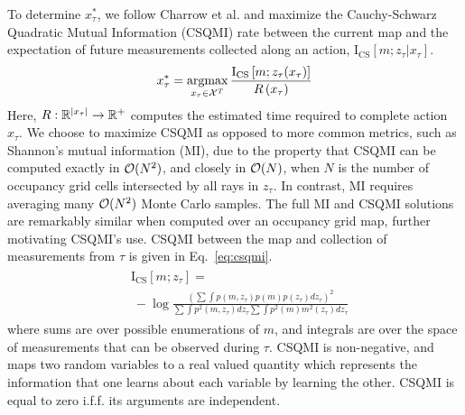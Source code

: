 To determine $x_{\tau}^{*}$, we follow Charrow et al. \cite{charrow15} and maximize the
Cauchy-Schwarz Quadratic Mutual Information (CSQMI) rate between the current map and the
expectation of future measurements collected along an action, $\text{I}_{\text{CS}}[m; z_{\tau} \vert
x_{\tau}]$.
%
\begin{align}
  \begin{split}
    x_{\tau}^{*}
    &=
    \argmax_{x_{\tau} \in \mc{X}^{T}}
    \frac{\text{I}_{\text{CS}}
      \left[
        m
        ;
        z_{\tau}(x_{\tau})
      \right]
    }
    {R\left(x_{\tau}\right)} \\
    \label{eq:mutual_information}
  \end{split}
\end{align}
%
Here, $R : {\mathbb{R}}^{\vert x_{\tau} \vert} \rightarrow {\mathbb{R}}^{+}$ computes the
estimated time required to complete action $x_{\tau}$. We choose to maximize
CSQMI as opposed to more common metrics, such as Shannon's mutual information
(MI), due to the property that CSQMI can be computed exactly
in $\mathcal{O}(N^{2})$, and closely in $\mathcal{O}(N)$, when $N$ is the number of occupancy
grid cells intersected by all rays in $z_{\tau}$. In contrast,
MI requires averaging many $\mathcal{O}(N^{2})$ Monte Carlo
samples. The full MI and CSQMI solutions are remarkably similar when computed
over an occupancy grid map, further motivating CSQMI's use. CSQMI between the
map and collection of measurements from $\tau$ is given in
Eq.~\eqref{eq:csqmi}.
%
\begin{align}
  \begin{split}
    &\text{I}_{\text{CS}}
    \left[
      m;
      z_{\tau}
    \right]
    = \\
    &\ -\log
    \frac
    {
      (
      \sum
      \int
      p(m, z_{\tau})
      p(m)
      p(z_{\tau})
      dz_{\tau}
      )^{2}
    }
    {
      \sum
      \int
      p^{2}(m, z_{\tau})
      dz_{\tau}
      \sum
      \int
      p^{2}(m)
      m^{2}(z_{\tau})dz_{\tau}
    }
    \label{eq:csqmi}
  \end{split}
\end{align}
%
where sums are over possible enumerations of $m$, and integrals are over the
space of measurements that can be observed during $\tau$. CSQMI is non-negative,
and maps two random variables to a real valued quantity
which represents the information that one learns about each variable by learning
the other. CSQMI is equal to zero i.f.f. its arguments are independent.

